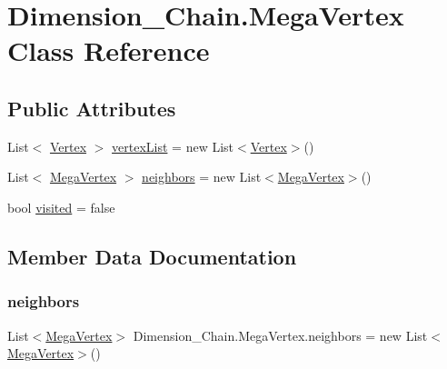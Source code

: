 \hypertarget{class_dimension___chain_1_1_mega_vertex}{}\section{Dimension\+\_\+\+Chain.\+Mega\+Vertex Class Reference}
\label{class_dimension___chain_1_1_mega_vertex}
\subsection*{Public Attributes}
\begin{DoxyCompactItemize}
\item 
List$<$ \mbox{\hyperlink{class_dimension___chain_1_1_vertex}{Vertex}} $>$ \mbox{\hyperlink{class_dimension___chain_1_1_mega_vertex_a6436cd17c7b224a2f5bc70706ab1e113}{vertex\+List}} = new List$<$\mbox{\hyperlink{class_dimension___chain_1_1_vertex}{Vertex}}$>$()
\item 
List$<$ \mbox{\hyperlink{class_dimension___chain_1_1_mega_vertex}{Mega\+Vertex}} $>$ \mbox{\hyperlink{class_dimension___chain_1_1_mega_vertex_ab0e8d9f1b5bcd0250a4eb0af29474dbd}{neighbors}} = new List$<$\mbox{\hyperlink{class_dimension___chain_1_1_mega_vertex}{Mega\+Vertex}}$>$()
\item 
bool \mbox{\hyperlink{class_dimension___chain_1_1_mega_vertex_a3b3d1b34b302a30828f1402a62c01004}{visited}} = false
\end{DoxyCompactItemize}


\subsection{Member Data Documentation}
\mbox{\label{class_dimension___chain_1_1_mega_vertex_ab0e8d9f1b5bcd0250a4eb0af29474dbd}} 
\subsubsection{\texorpdfstring{neighbors}{neighbors}}
{\footnotesize\ttfamily List$<$\mbox{\hyperlink{class_dimension___chain_1_1_mega_vertex}{Mega\+Vertex}}$>$ Dimension\+\_\+\+Chain.\+Mega\+Vertex.\+neighbors = new List$<$\mbox{\hyperlink{class_dimension___chain_1_1_mega_vertex}{Mega\+Vertex}}$>$()}

